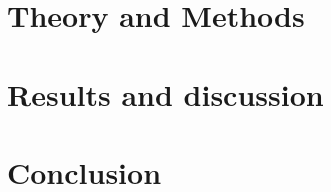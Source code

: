 \documentclass[english,notitlepage,reprint,nofootinbib]{revtex4-2}  %
\begin{document}
\section{Theory and Methods}\label{sec:methods}


\section{Results and discussion}\label{sec:results_and_discussion}

\section{Conclusion}\label{sec:conclusion}






\onecolumngrid
% 


\end{document}

